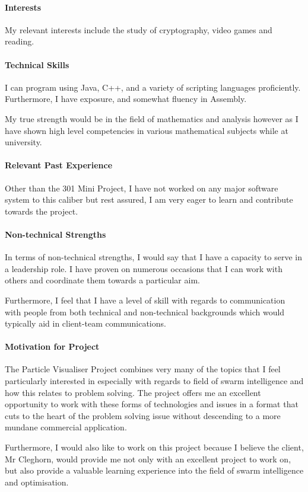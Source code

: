 \documentclass[12pt]{article}
\begin{document}
\paragraph{Interests}
My relevant interests include the study of cryptography, video games and reading.
\paragraph{Technical Skills}
I can program using Java, C++, and a variety of scripting languages proficiently.
Furthermore, I have exposure, and somewhat fluency in Assembly.

My true strength would be in the field of mathematics and analysis however as I have shown high level competencies in various mathematical subjects while at university.
\paragraph{Relevant Past Experience}
Other than the 301 Mini Project, I have not worked on any major software system to this caliber but rest assured, I am very eager to learn and contribute towards the project.
\paragraph{Non-technical Strengths}
In terms of non-technical strengths, I would say that I have a capacity to serve in a leadership role. I have proven on numerous occasions that I can work with others and coordinate them towards a particular aim.

Furthermore, I feel that I have a level of skill with regards to communication with people from both technical and non-technical backgrounds which would typically aid in client-team communications.
\paragraph{Motivation for Project}
The Particle Visualiser Project combines very many of the topics that I feel particularly interested in especially with regards to field of swarm intelligence and how this relates to problem solving. The project offers me an excellent opportunity to work with these forms of technologies and issues in a format that cuts to the heart of the problem solving issue without descending to a more mundane commercial application.

Furthermore, I would also like to work on this project because I believe the client, Mr Cleghorn, would provide me not only with an excellent project to work on, but also provide a valuable learning experience into the field of swarm intelligence and optimisation.
\end{document}

